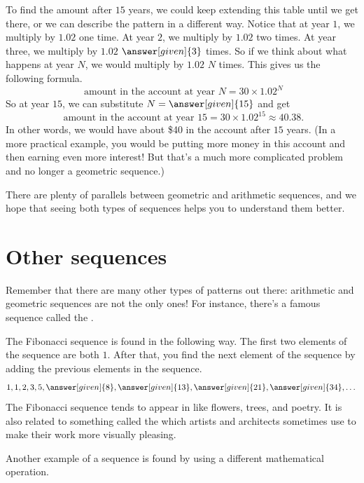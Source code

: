 \documentclass{ximera}
\begin{document}
\begin{example}
To find the amount after $15$ years, we could keep extending this table until we get there, or we can describe the pattern in a different way. Notice that at year $1$, we multiply by $1.02$ one time. At year $2$, we multiply by $1.02$ two times. At year three, we multiply by $1.02$ $\answer[given]{3}$ times. So if we think about what happens at year $N$, we would multiply by $1.02$ $N$ times. This gives us the following formula.
\[
\textrm{ amount in the account at year } N = 30 \times 1.02^N
\]
So at year $15$, we can substitute $N = \answer[given]{15}$ and get
\[
\textrm{ amount in the account at year } 15 = 30 \times 1.02^{15} \approx 40.38.
\]
In other words, we would have about \$40 in the account after $15$ years. (In a more practical example, you would be putting more money in this account and then earning even more interest! But that's a much more complicated problem and no longer a geometric sequence.)

\end{example}
There are plenty of parallels between geometric and arithmetic sequences, and we hope that seeing both types of sequences helps you to understand them better.




\section{Other sequences}

Remember that there are many other types of patterns out there: arithmetic and geometric sequences are not the only ones! For instance, there's a famous sequence called the .
\begin{example}
The Fibonacci sequence is found in the following way. The first two elements of the sequence are both $1$. After that, you find the next element of the sequence by adding the previous elements in the sequence.
\[
1, 1, 2, 3, 5, \answer[given]{8}, \answer[given]{13}, \answer[given]{21}, \answer[given]{34}, \dots
\]
The Fibonacci sequence tends to appear in  like flowers, trees, and poetry. It is also related to something called the  which artists and architects sometimes use to make their work more visually pleasing.
\end{example}


Another example of a sequence is found by using a different mathematical operation.
\end{document}
